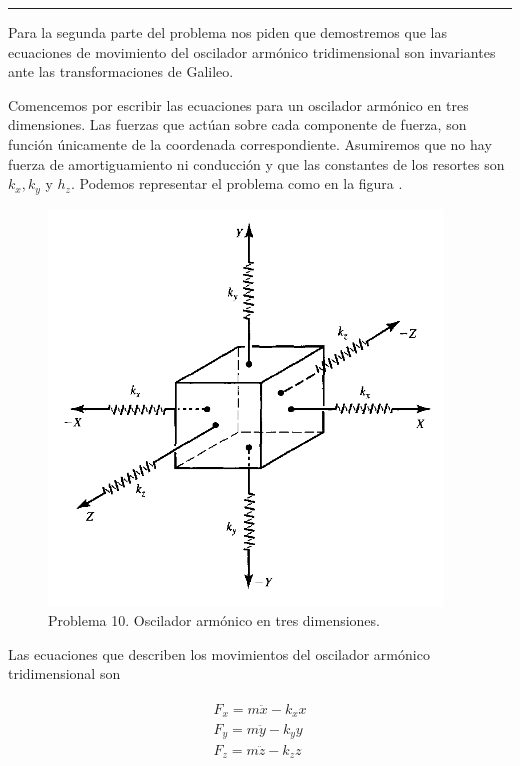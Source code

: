 \documentclass[a4paper,10pt]{article}
\numberwithin{equation}{section}
\begin{document}
\noindent\rule[0.5ex]{\linewidth}{1pt}

Para la segunda parte del problema nos piden que demostremos que las ecuaciones de 
movimiento del oscilador armónico tridimensional son invariantes ante las transformaciones
de Galileo.

\vspace{.3cm}

Comencemos por escribir las ecuaciones para un oscilador armónico en tres dimensiones.
Las fuerzas que actúan sobre cada componente de fuerza, son función únicamente
de la coordenada correspondiente. Asumiremos que no hay fuerza de amortiguamiento ni
conducción y que las constantes de los resortes son $k_x,k_y$ y $h_z$. Podemos representar
el problema como en la figura . 

\vspace{.3cm}

\begin{figure}[h]
 \centering
\includegraphics[scale=0.4]{problema10fig1}
\caption{Problema 10. Oscilador armónico en tres dimensiones.}
\label{fig:problema10fig1}
\end{figure}

Las ecuaciones que describen los movimientos del oscilador armónico tridimensional son

\begin{align}
 \begin{split}
  F_x = m\ddot{x} - k_x x \\
  F_y = m\ddot{y} - k_y y \\
  F_z = m\ddot{z} - k_z z \\
 \end{split}
\end{align}
\end{document}
